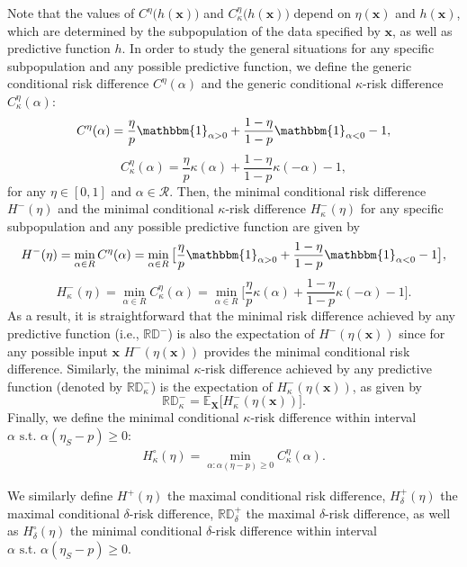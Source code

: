 \documentclass[letterpaper]{article} %
\newcommand{\X}{\mathbf{X}}
\newcommand{\x}{\mathbf{x}}
\newcommand{\E}{\mathbb{E}}
\newcommand{\I}{\mathbbm{1}}
\newcommand{\RD}{\mathbb{RD}}
\newcommand{\crd}{C^{\eta}}
\begin{document}
Note that the values of $\crd \big( h(\x) \big)$ and $\crd_{\kappa} \big( h(\x) \big)$ depend on $\eta (\x)$ and $h( \x )$, which are determined by the subpopulation of the data specified by $\x$, as well as predictive function $h$. In order to study the general situations for any specific subpopulation and any possible predictive function, we define the generic conditional risk difference $\crd(\alpha)$ and the generic conditional $\kappa$-risk difference $\crd_{\kappa}(\alpha)$:
\[ \crd(\alpha) = \frac{\eta}{p} \I_{\alpha>0} + \frac{1-\eta}{1-p} \I_{\alpha<0} - 1, \]
\[ \crd_{\kappa} (\alpha) = \frac{ \eta }{p} \kappa ( \alpha)  + \frac{1-\eta}{1-p} \kappa (-\alpha ) - 1, \]
for any $\eta\in [0,1]$ and $\alpha\in \mathcal{R}$. Then, the minimal conditional risk difference $H^{-} (\eta)$ and the minimal conditional $\kappa$-risk difference $H^{-}_{\kappa} (\eta)$ for any specific subpopulation and any possible predictive function are given by
\begin{equation*}
	H^{-} (\eta) = \min_{\alpha \in R} \crd (\alpha) = \min_{\alpha \in R} \big[ \frac{\eta}{p} \I_{\alpha>0} + \frac{ 1- \eta}{1-p} \I_{\alpha<0} -1 \big],
\end{equation*}
\begin{equation}
	\label{eq:H:inf} H^{-}_{\kappa} (\eta) = \min_{\alpha \in R} \crd_\kappa (\alpha) = \min_{\alpha \in R} \big[ \frac{\eta}{p} \kappa ( \alpha)  + \frac{ 1- \eta}{1-p} \kappa ( - \alpha ) -1   \big].
\end{equation}
As a result, it is straightforward that the minimal risk difference achieved by any predictive function (i.e., $\RD^{-}$) is also the expectation of $H^{-} (\eta(\x))$ since for any possible input $\x$ $H^{-} (\eta(\x))$ provides the minimal conditional risk difference.
Similarly, the minimal $\kappa$-risk difference achieved by any predictive function (denoted by $\RD^{-}_{\kappa}$) is the expectation of $H^{-}_{\kappa} (\eta(\x))$, as given by %
\[ \RD^{-}_{\kappa} = \E_\X \big[ H^{-}_{\kappa} (\eta(\x)) \big]. \]
Finally, we define the minimal conditional $\kappa$-risk difference within interval $ \alpha \text{ s.t. } \alpha( \eta_S - p ) \geq 0 $:
\begin{eqnarray}
	H^{\circ}_{\kappa} (\eta) = \min_{\alpha : \alpha( \eta - p ) \geq 0} \crd_\kappa (\alpha).
	\label{eq:H:secondary}
\end{eqnarray}

We similarly define $H^{+}(\eta)$ the maximal conditional risk difference, $H^{+}_{\delta} (\eta)$ the maximal conditional $\delta$-risk difference, $\RD^{+}_{\delta}$ the maximal $\delta$-risk difference, as well as $H^{\circ}_{\delta} (\eta)$ the minimal conditional $\delta$-risk difference within interval $ \alpha \text{ s.t. } \alpha( \eta_S - p ) \geq 0 $.
\end{document}
